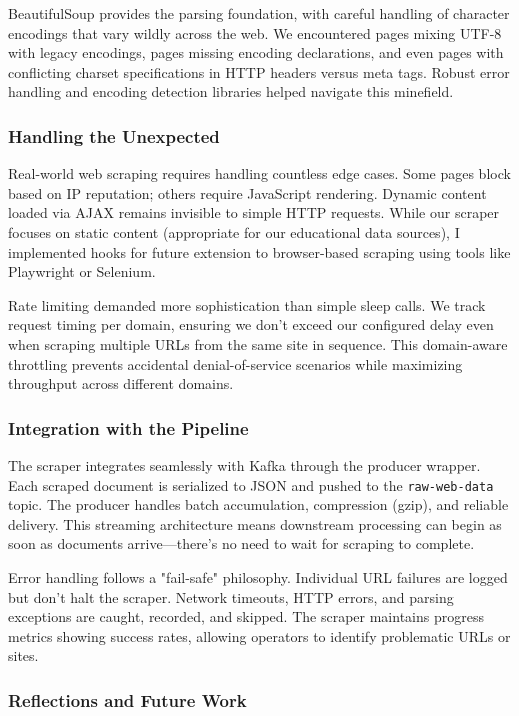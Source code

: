 \documentclass[12pt, a4paper]{article}
\begin{document}
BeautifulSoup provides the parsing foundation, with careful handling of character encodings that vary wildly across the web. We encountered pages mixing UTF-8 with legacy encodings, pages missing encoding declarations, and even pages with conflicting charset specifications in HTTP headers versus meta tags. Robust error handling and encoding detection libraries helped navigate this minefield.

\subsubsection*{Handling the Unexpected}

Real-world web scraping requires handling countless edge cases. Some pages block based on IP reputation; others require JavaScript rendering. Dynamic content loaded via AJAX remains invisible to simple HTTP requests. While our scraper focuses on static content (appropriate for our educational data sources), I implemented hooks for future extension to browser-based scraping using tools like Playwright or Selenium.

Rate limiting demanded more sophistication than simple sleep calls. We track request timing per domain, ensuring we don't exceed our configured delay even when scraping multiple URLs from the same site in sequence. This domain-aware throttling prevents accidental denial-of-service scenarios while maximizing throughput across different domains.

\subsubsection*{Integration with the Pipeline}

The scraper integrates seamlessly with Kafka through the producer wrapper. Each scraped document is serialized to JSON and pushed to the \texttt{raw-web-data} topic. The producer handles batch accumulation, compression (gzip), and reliable delivery. This streaming architecture means downstream processing can begin as soon as documents arrive—there's no need to wait for scraping to complete.

Error handling follows a "fail-safe" philosophy. Individual URL failures are logged but don't halt the scraper. Network timeouts, HTTP errors, and parsing exceptions are caught, recorded, and skipped. The scraper maintains progress metrics showing success rates, allowing operators to identify problematic URLs or sites.

\subsubsection*{Reflections and Future Work}
\end{document}
